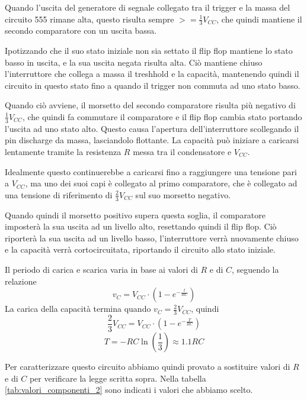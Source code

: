 \noindent
Quando l'uscita del generatore di segnale collegato tra il trigger e la massa del circuito 555 rimane alta, questo risulta sempre $>=\frac{1}{3}V_{CC}$, che quindi mantiene il secondo comparatore con un uscita bassa.

\noindent
Ipotizzando che il suo stato iniziale non sia settato il flip flop mantiene lo stato basso in uscita, e la sua uscita negata risulta alta. Ciò mantiene chiuso l'interruttore che collega a massa il treshhold e la capacità, mantenendo quindi il circuito in questo stato fino a quando il trigger non commuta ad uno stato basso.

\noindent
Quando ciò avviene, il morsetto del secondo comparatore risulta più negativo di $\frac{1}{3}V_{CC}$, che quindi fa commutare il comparatore e il flip flop cambia stato portando l'uscita ad uno stato alto. Questo causa l'apertura dell'interruttore scollegando il pin discharge da massa, lasciandolo flottante.
La capacità può iniziare a caricarsi lentamente tramite la resistenza $R$ messa tra il condensatore e $V_{CC}$. 

\noindent
Idealmente questo continuerebbe a caricarsi fino a raggiungere una tensione pari a $V_{CC}$, ma uno dei suoi capi è collegato al primo comparatore, che è collegato ad una tensione di riferimento di $\frac{2}{3}V_{CC}$ sul suo morsetto negativo. 

\noindent
Quando quindi il morsetto positivo supera questa soglia, il comparatore imposterà la sua uscita ad un livello alto, resettando quindi il flip flop. Ciò riporterà la sua uscita ad un livello basso, l'interruttore verrà nuovamente chiuso e la capacità verrà cortocircuitata, riportando il circuito allo stato iniziale.

\noindent
Il periodo di carica e scarica varia in base ai valori di $R$ e di $C$, seguendo la relazione
\[v_C = V_{CC}\cdot\left(1-e^{-\frac{t}{RC}}\right)\]
La carica della capacità termina quando $v_C = \frac{2}{3}V_{CC}$, quindi
\[\frac{2}{3}V_{CC} = V_{CC}\cdot\left(1-e^{-\frac{T}{RC}}\right)\]
\[T=-RC\ln\left(\frac{1}{3}\right)\approx1.1RC\]

Per caratterizzare questo circuito abbiamo quindi provato a sostituire valori di $R$ e di $C$ per verificare la legge scritta sopra. Nella tabella \ref{tab:valori_componenti_2} sono indicati i valori che abbiamo scelto.

